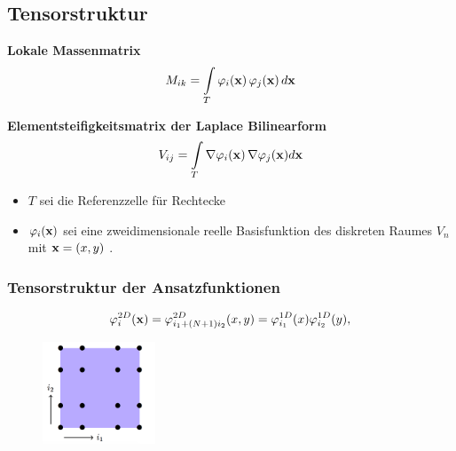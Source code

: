 \subsection{Tensorstruktur}

\begin{frame}

\begin{framed}
\textbf{Lokale Massenmatrix}
\begin{equation*} \label{eq:mass}
M_{ik} = \int\limits_{T} \varphi_i (\bold{x}) \, \varphi_j (\bold{x}) \, d\bold{x}
\end{equation*}

\textbf{Elementsteifigkeitsmatrix der Laplace Bilinearform}
\begin{equation*}
V_{ij} = \int\limits_{T} \nabla \varphi_i(\bold{x}) \, \nabla \varphi_j(\bold{x})  d \bold{x}
\end{equation*}
\end{framed}

\begin{itemize}
\item $T$ sei die Referenzzelle für Rechtecke
\item $\varphi_i(\bold{x})$ sei eine zweidimensionale reelle Basisfunktion des diskreten Raumes $V_n$ mit $\bold{x}=(x,y)$ .
\end{itemize}

\end{frame}



\begin{frame}
\frametitle{Tensorstruktur der Ansatzfunktionen}

\begin{equation*} \label{eq:tensor}
\varphi^{2D}_i(\bold{x})=\varphi^{2D}_{i_1+(N+1)i_2}(x,y)=\varphi^{1D}_{i_1}(x)\varphi^{1D}_{i_2}(y),
\end{equation*}

\begin{figure}[ht] 
	\centering
  \includegraphics[width=0.3\textwidth]{lexi.png}
	\caption{ \cite[3]{Teachlet}}
	\label{fig:lexi}
\end{figure}

\end{frame}

